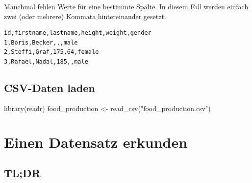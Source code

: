 \documentclass[
]{book}
\newenvironment{Shaded}{\begin{snugshade}}{\end{snugshade}}
\newcommand{\FunctionTok}[1]{\textcolor[rgb]{0.00,0.00,0.00}{#1}}
\newcommand{\NormalTok}[1]{#1}
\newcommand{\OtherTok}[1]{\textcolor[rgb]{0.56,0.35,0.01}{#1}}
\newcommand{\StringTok}[1]{\textcolor[rgb]{0.31,0.60,0.02}{#1}}
\begin{document}
Manchmal fehlen Werte für eine bestimmte Spalte. In diesem Fall werden einfach zwei (oder mehrere) Kommata hintereinander gesetzt.

\begin{verbatim}
id,firstname,lastname,height,weight,gender
1,Boris,Becker,,,male
2,Steffi,Graf,175,64,female
3,Rafael,Nadal,185,,male
\end{verbatim}

\hypertarget{csv-daten-laden}{%
\section{CSV-Daten laden}\label{csv-daten-laden}}

\begin{Shaded}
\begin{Highlighting}[]
\FunctionTok{library}\NormalTok{(readr)}
\NormalTok{food\_production }\OtherTok{\textless{}{-}} \FunctionTok{read\_csv}\NormalTok{(}\StringTok{"food\_production.csv"}\NormalTok{)}
\end{Highlighting}
\end{Shaded}

\hypertarget{einen-datensatz-erkunden}{%
\chapter{Einen Datensatz erkunden}\label{einen-datensatz-erkunden}}

\hypertarget{tldr-2}{%
\section*{TL;DR}\label{tldr-2}}
\end{document}
